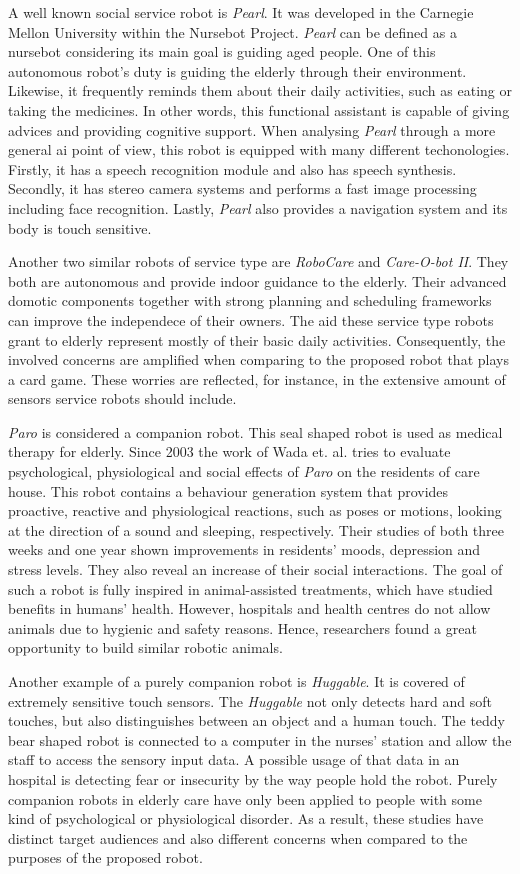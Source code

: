 A well known social service robot is \emph{Pearl}.
It was developed in the Carnegie Mellon University within the Nursebot Project.
\emph{Pearl} can be defined as a nursebot considering its main goal is guiding aged people.
One of this autonomous robot's duty is guiding the elderly through their environment.
Likewise, it frequently reminds them about their daily activities, such as eating or taking the medicines.
In other words, this functional assistant is capable of giving advices and providing cognitive support.
When analysing \emph{Pearl} through a more general \gls{ai} point of view, this robot is equipped with many different techonologies.
Firstly, it has a speech recognition module and also has speech synthesis.
Secondly, it has stereo camera systems and performs a fast image processing including face recognition.
Lastly, \emph{Pearl} also provides a navigation system and its body is touch sensitive.

Another two similar robots of service type are \emph{RoboCare} and \emph{Care-O-bot II}.
They both are autonomous and provide indoor guidance to the elderly.
Their advanced domotic components together with strong planning and scheduling frameworks can improve the independece of their owners.
The aid these service type robots grant to elderly represent mostly of their basic daily activities.
Consequently, the involved concerns are amplified when comparing to the proposed robot that plays a card game.
These worries are reflected, for instance, in the extensive amount of sensors service robots should include.

\emph{Paro} is considered a companion robot.
This seal shaped robot is used as medical therapy for elderly.
Since 2003 the work of Wada et. al. tries to evaluate psychological, physiological and social effects of \emph{Paro} on the residents of care house.
This robot contains a behaviour generation system that provides proactive, reactive and physiological reactions, such as poses or motions, looking at the direction of a sound and sleeping, respectively.
Their studies of both three weeks and one year shown improvements in residents' moods, depression and stress levels.
They also reveal an increase of their social interactions.
The goal of such a robot is fully inspired in animal-assisted treatments, which have studied benefits in humans' health.
However, hospitals and health centres do not allow animals due to hygienic and safety reasons.
Hence, researchers found a great opportunity to build similar robotic animals.

Another example of a purely companion robot is \emph{Huggable}.
It is covered of extremely sensitive touch sensors.
The \emph{Huggable} not only detects hard and soft touches, but also distinguishes between an object and a human touch.
The teddy bear shaped robot is connected to a computer in the nurses' station and allow the staff to access the sensory input data.
A possible usage of that data in an hospital is detecting fear or insecurity by the way people hold the robot.
Purely companion robots in elderly care have only been applied to people with some kind of psychological or physiological disorder.
As a result, these studies have distinct target audiences and also different concerns when compared to the purposes of the proposed robot.



